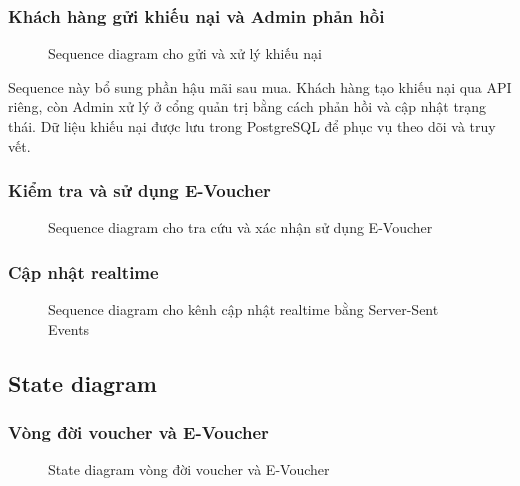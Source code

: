 \subsubsection{Khách hàng gửi khiếu nại và Admin phản hồi}

\begin{figure}[H]
\centering
{}
\caption{Sequence diagram cho gửi và xử lý khiếu nại}
\end{figure}

Sequence này bổ sung phần hậu mãi sau mua. Khách hàng tạo khiếu nại qua API riêng, còn Admin xử lý ở cổng quản trị bằng cách phản hồi và cập nhật trạng thái. Dữ liệu khiếu nại được lưu trong PostgreSQL để phục vụ theo dõi và truy vết.

\subsubsection{Kiểm tra và sử dụng E-Voucher}

\begin{figure}[H]
\centering
{}
\caption{Sequence diagram cho tra cứu và xác nhận sử dụng E-Voucher}
\end{figure}

\subsubsection{Cập nhật realtime}

\begin{figure}[H]
\centering
{}
\caption{Sequence diagram cho kênh cập nhật realtime bằng Server-Sent Events}
\end{figure}

\subsection{State diagram}

\subsubsection{Vòng đời voucher và E-Voucher}

\begin{figure}[H]
\centering
{}
\caption{State diagram vòng đời voucher và E-Voucher}
\end{figure}

